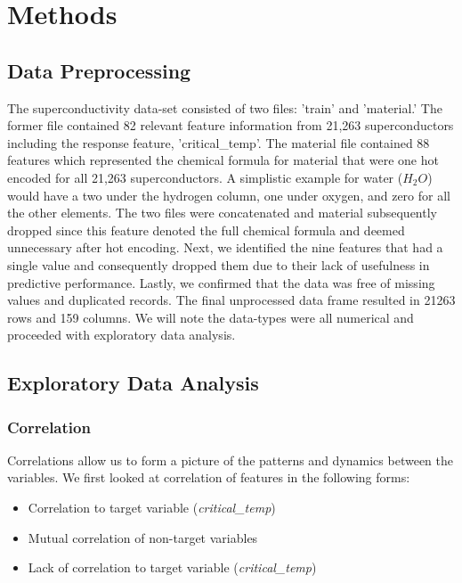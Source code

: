 \documentclass[twoside,twocolumn]{article}
\begin{document}

\section{Methods}

\subsection{Data Preprocessing}
The superconductivity data-set consisted of two files: 'train' and 'material.' The former file contained 82 relevant feature information from 21,263 superconductors including the response feature, 'critical\_temp'. The material file contained 88 features which represented the chemical formula for material that were one hot encoded for all 21,263 superconductors. A simplistic example for water ($H_{2}O$) would have a two under the hydrogen column, one under oxygen, and zero for all the other elements. The two files were concatenated and material subsequently dropped since this feature denoted the full chemical formula and deemed unnecessary after hot encoding. Next, we identified the nine features that had a single value and consequently dropped them due to their lack of usefulness in predictive performance. Lastly, we confirmed that the data was free of missing values and duplicated records. The final unprocessed data frame resulted in 21263 rows and 159 columns. We will note the data-types were all numerical and proceeded with exploratory data analysis. 

\subsection{Exploratory Data Analysis}

\subsubsection{Correlation}
Correlations allow us to form a picture of the patterns and dynamics between the variables. We first looked at correlation of features in the following forms:
\begin{itemize}
\item Correlation to target variable (\emph{critical\_temp})
\item Mutual correlation of non-target variables
\item Lack of correlation to target variable (\emph{critical\_temp})
\end{itemize}
\end{document}

